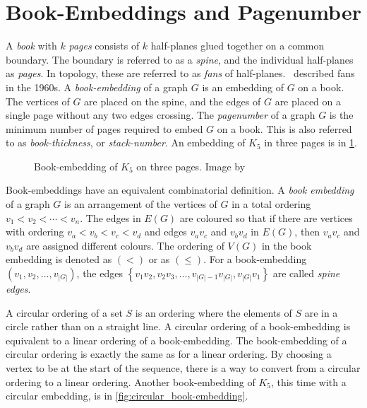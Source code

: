 \section{Book-Embeddings and Pagenumber}\label{sec:Book Embedding}
A \textit{book} with \(k\) \textit{pages} consists of \(k\) half-planes glued together on a common boundary. The boundary is referred to as a \textit{spine}, and the individual half-planes as \textit{pages}. In topology, these are referred to as \textit{fans} of half-planes.\ \textcite{persingerSubsetsNbooksE31966,atneosenOnedimensionalNleavedContinua1972} described fans in the 1960s.
A \textit{book-embedding} of a graph \(G\) is an embedding of \(G\) on a book. The vertices of \(G\) are placed on the spine, and the edges of $G$ are placed on a single page without any two edges crossing. 
The \textit{pagenumber} of a graph \(G\) is the minimum number of pages required to embed \(G\) on a book. This is also referred to as \textit{book-thickness}, or \textit{stack-number}. An embedding of $K_5$ in three pages is in \cref{fig:book-embedding}.

\begin{figure}[h!]
	\centering
	
	\caption[Three-page book-embedding of $K_5$]{Book-embedding of $K_5$ on three pages. Image by \textcite{eppsteinBookEmbedding2014}}\label{fig:book-embedding}
\end{figure}

Book-embeddings have an equivalent combinatorial definition. A \textit{book embedding} of a graph \(G\) is an arrangement of the vertices of \(G\) in a total ordering \(v_1 < v_2 < \cdots < v_n\). The edges in \(E(G)\) are coloured so that if there are vertices with ordering \(v_a < v_b < v_c < v_d\) and edges \(v_a v_c\) and \(v_b v_d\) in $E(G)$, then $v_a v_c$ and $v_b v_d$ are assigned different colours.
The ordering of \(V(G)\) in the book embedding is denoted as \((<)\) or as \((\leq)\). For a book-embedding \((v_1, v_2, \ldots, v_{|G|})\), the edges \( \left\{ v_1 v_2, v_2 v_3, \ldots, v_{|G| - 1}v_{|G|}, v_{|G|}v_{1} \right\} \) are called \textit{spine edges}.

A circular ordering of a set $S$ is an ordering where the elements of $S$ are in a circle rather than on a straight line. A circular ordering of a book-embedding is equivalent to a linear ordering of a book-embedding. The book-embedding of a circular ordering is exactly the same as for a linear ordering. By choosing a vertex to be at the start of the sequence, there is a way to convert from a circular ordering to a linear ordering. Another book-embedding of $K_5$, this time with a circular embedding, is in \cref{fig:circular_book-embedding}.

